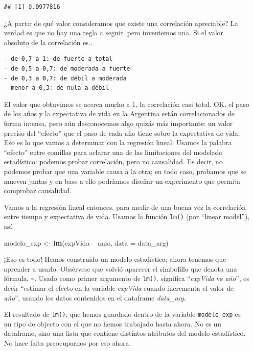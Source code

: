 \documentclass[spanish,]{book}
\newenvironment{Shaded}{\begin{snugshade}}{\end{snugshade}}
\newcommand{\DataTypeTok}[1]{\textcolor[rgb]{0.13,0.29,0.53}{#1}}
\newcommand{\KeywordTok}[1]{\textcolor[rgb]{0.13,0.29,0.53}{\textbf{#1}}}
\newcommand{\NormalTok}[1]{#1}
\newcommand{\OperatorTok}[1]{\textcolor[rgb]{0.81,0.36,0.00}{\textbf{#1}}}
\newcommand{\StringTok}[1]{\textcolor[rgb]{0.31,0.60,0.02}{#1}}
\begin{document}
\begin{verbatim}
## [1] 0.9977816
\end{verbatim}

¿A partir de qué valor consideramos que existe una correlación apreciable? La verdad es que no hay una regla a seguir, pero inventemos una. Si el valor absoluto de la correlación es..

\begin{verbatim}
- de 0,7 a 1: de fuerte a total
- de 0,5 a 0,7: de moderada a fuerte
- de 0,3 a 0,7: de débil a moderada
- menor a 0,3: de nula a débil
\end{verbatim}

El valor que obtuvimos se acerca mucho a 1, la correlación casi total. OK, el paso de los años y la expectativa de vida en la Argentina están correlacionados de forma intensa, pero aún desconocemos algo quizás más importante: un valor preciso del ``efecto'' que el paso de cada año tiene sobre la expectativa de vida. Eso es lo que vamos a determinar con la regresión lineal. Usamos la palabra ``efecto'' entre comillas para aclarar una de las limitaciones del modelado estadístico: podemos probar correlación, pero no causalidad. Es decir, no podemos probar que una variable causa a la otra; en todo caso, probamos que se mueven juntas y en base a ello podríamos diseñar un experimento que permita comprobar causalidad.

Vamos a la regresión lineal entonces, para medir de una buena vez la correlación entre tiempo y expectativa de vida. Usamos la función \texttt{lm()} (por ``linear model''), así:

\begin{Shaded}
\begin{Highlighting}[]
\NormalTok{modelo_exp <-}\StringTok{ }\KeywordTok{lm}\NormalTok{(expVida }\OperatorTok{~}\StringTok{ }\NormalTok{anio, }\DataTypeTok{data =}\NormalTok{ data_arg)}
\end{Highlighting}
\end{Shaded}

¡Eso es todo! Hemos construido un modelo estadístico; ahora tenemos que aprender a usarlo. Obsérvese que volvió aparecer el simbolillo que denota una fórmula, \texttt{\textasciitilde{}}. Usado como primer argumento de \texttt{lm()}, significa ``\emph{expVida} vs \emph{año}'', es decir ``estimar el efecto en la variable \emph{expVida} cuando incrementa el valor de \emph{año}'', usando los datos contenidos en el dataframe \emph{data\_arg}.

El resultado de \texttt{lm()}, que hemos guardado dentro de la variable \texttt{modelo\_exp} es un tipo de objecto con el que no hemos trabajado hasta ahora. No es un dataframe, sino una lista que contiene distintos atributos del modelo estadístico. No hace falta preocuparnos por eso ahora.
\end{document}

